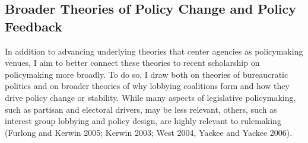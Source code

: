

\subsection{Broader Theories of Policy Change and Policy Feedback}


In addition to advancing underlying theories that center agencies as policymaking venues, I aim to better connect these theories to recent scholarship on policymaking more broadly. To do so, I draw both on theories of bureaucratic politics and on broader theories of why lobbying coalitions form and how they drive policy change or stability. While many aspects of legislative policymaking, such as partisan and electoral drivers, may be less relevant, others, such as interest group lobbying and policy design, are highly relevant to rulemaking (Furlong and Kerwin 2005; Kerwin 2003; West 2004, Yackee and Yackee 2006).


